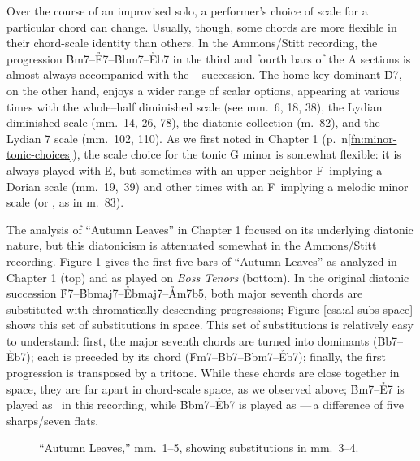 Over the course of an improvised solo, a performer's choice of scale for a
particular chord can change. Usually, though, some chords are more flexible in
their chord-scale identity than others. In the Ammons/Stitt
recording, the progression \h{Bm7}--\h{E7}--\h{Bbm7}--\h{Eb7} in the third and
fourth bars of the A sections is almost always accompanied with the
-- succession. The
home-key dominant \h{D7}, on the other hand, enjoys a wider range of scalar
options, appearing at various times with the whole--half diminished scale (see
mm.~6, 18, 38), the Lydian diminished scale (mm.~14, 26, 78), the diatonic
collection (m.~82), and the Lydian \flat{}7 scale (mm.~102, 110). As we first
noted in Chapter 1
(p.~\pageref{fn:minor-tonic-choices}n\ref{fn:minor-tonic-choices}), the scale
choice for the tonic G minor is somewhat flexible: it is always played with
E\nat, but sometimes with an upper-neighbor F\nat\ implying a Dorian scale
(mm.~19,~39) and other times with an F\sharp\ implying a melodic minor scale
(or , as in m.~83).

The analysis of ``Autumn Leaves'' in Chapter 1 focused on its underlying
diatonic nature, but this diatonicism is attenuated somewhat in the
Ammons/Stitt recording. Figure \ref{csa:al-subs} gives the first five bars of
``Autumn Leaves'' as analyzed in Chapter 1 (top) and as played on \emph{Boss
  Tenors} (bottom). In the original diatonic succession
\h{F7}--\h{Bbmaj7}--\h{Ebmaj7}--\h{Am7b5}, both major seventh chords are
substituted with chromatically descending \tf progressions; Figure
\ref{csa:al-subs-space} shows this set of substitutions in \tf space. This set
of substitutions is relatively easy to understand: first, the major seventh
chords are turned into dominants (\h{Bb7}--\h{Eb7}); each is preceded by its
\ii chord (\h{Fm7}--\h{Bb7}--\h{Bbm7}--\h{Eb7}); finally, the first \tf
progression is transposed by a tritone. While these chords are close together
in \tf space, they are far apart in chord-scale space, as we observed above;
\h{Bm7}--\h{E7} is played as \ in this recording,
while \h{Bbm7}--\h{Eb7} is played as ---\,a difference
of five sharps/seven flats.

\begin{figure}[tbp]
  \caption{``Autumn Leaves,'' mm.~1--5, showing substitutions in mm.~3--4.}
  \label{csa:al-subs}
\end{figure}


